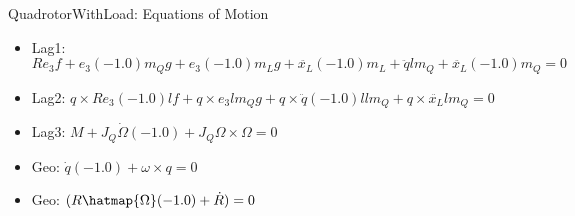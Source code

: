 QuadrotorWithLoad: Equations of Motion
\begin{itemize}
\item Lag1: $R e_3 f+e_3 (-1.0) m_Q g+e_3 (-1.0) m_L g+\ddot{x_L} (-1.0) m_L+\ddot{q} l m_Q+\ddot{x_L} (-1.0) m_Q = 0$
\item Lag2: $q\times R e_3 (-1.0) l f+q\times e_3 l m_Q g+q\times \ddot{q} (-1.0) l l m_Q+q\times \ddot{x_L} l m_Q = 0$
\item Lag3: $M+J_Q \dot{\Omega } (-1.0)+J_Q \Omega \times \Omega  = 0$
\item Geo: $\dot{q} (-1.0)+\omega \times q = 0$
\item Geo: $(R \hatmap{\Omega } (-1.0)+\dot{R}) = 0$
\end{itemize}